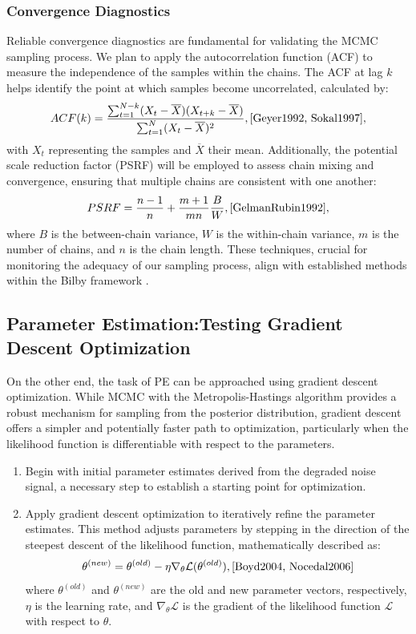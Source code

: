 \documentclass[12pt]{article}
\begin{document}
\subsubsection{Convergence Diagnostics}

Reliable convergence diagnostics are fundamental for validating the MCMC sampling process. We plan to apply the autocorrelation function (ACF) to measure the independence of the samples within the chains. The ACF at lag \( k \) helps identify the point at which samples become uncorrelated, calculated by:
\[
ACF(k) = \frac{\sum_{t=1}^{N-k} (X_t - \overline{X})(X_{t+k} - \overline{X})}{\sum_{t=1}^N (X_t - \overline{X})^2},\cite{Geyer1992, Sokal1997},
\]
with \( X_t \) representing the samples and \( \overline{X} \) their mean. Additionally, the potential scale reduction factor (PSRF) will be employed to assess chain mixing and convergence, ensuring that multiple chains are consistent with one another:
\[
PSRF = \frac{n - 1}{n} + \frac{m+1}{mn} \frac{B}{W}, \cite{GelmanRubin1992}, \]
where \( B \) is the between-chain variance, \( W \) is the within-chain variance, \( m \) is the number of chains, and \( n \) is the chain length. These techniques, crucial for monitoring the adequacy of our sampling process, align with established methods within the Bilby framework \cite{Bilby-MCMC}.


\subsection{Parameter Estimation:Testing Gradient Descent Optimization}

On the other end, the task of PE can be approached using gradient descent optimization. While MCMC with the Metropolis-Hastings algorithm provides a robust mechanism for sampling from the posterior distribution, gradient descent offers a simpler and potentially faster path to optimization, particularly when the likelihood function is differentiable with respect to the parameters.

\begin{enumerate}
    \item Begin with initial parameter estimates derived from the degraded noise signal, a necessary step to establish a starting point for optimization.
    \item Apply gradient descent optimization to iteratively refine the parameter estimates. This method adjusts parameters by stepping in the direction of the steepest descent of the likelihood function, mathematically described as:
    \[
    \theta^{(new)} = \theta^{(old)} - \eta \nabla_\theta \mathcal{L}(\theta^{(old)}) , \cite{Boyd2004, Nocedal2006}
    \]
    where \( \theta^{(old)} \) and \( \theta^{(new)} \) are the old and new parameter vectors, respectively, \( \eta \) is the learning rate, and \( \nabla_\theta \mathcal{L} \) is the gradient of the likelihood function \( \mathcal{L} \) with respect to \( \theta \).

\end{enumerate}
\end{document}
